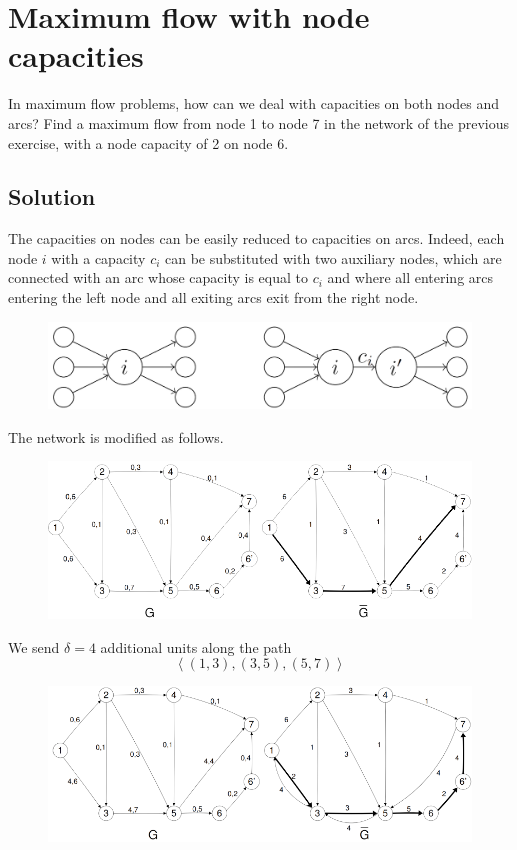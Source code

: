\documentclass[12pt, a4paper]{report}
\begin{document}
    \newpage

    \section{Maximum flow with node capacities}
        In maximum flow problems, how can we deal with capacities on both nodes and arcs? Find a maximum flow from node 1 to node 7 in the network of the previous exercise, 
        with a node capacity of 2 on node 6.
    \subsection*{Solution}
        The capacities on nodes can be easily reduced to capacities on arcs. Indeed, each node $i$ with a capacity $c_i$ can be substituted with two auxiliary nodes, 
        which are connected with an arc whose capacity is equal to $c_i$ and where all entering arcs entering the left node and all exiting arcs exit from the right node.
        \begin{figure}[H]
            \centering
            \includegraphics[width=0.5\linewidth]{images/max.png}
        \end{figure}
        The network is modified as follows. 
        \begin{figure}[H]
            \centering
            \includegraphics[width=0.9\linewidth]{images/max1.png}
        \end{figure}
        We send $\delta=4$ additional units along the path \[\left\langle (1, 3),(3, 5),(5, 7) \right\rangle\]
        \begin{figure}[H]
            \centering
            \includegraphics[width=0.9\linewidth]{images/max2.png}
        \end{figure}
\end{document}
